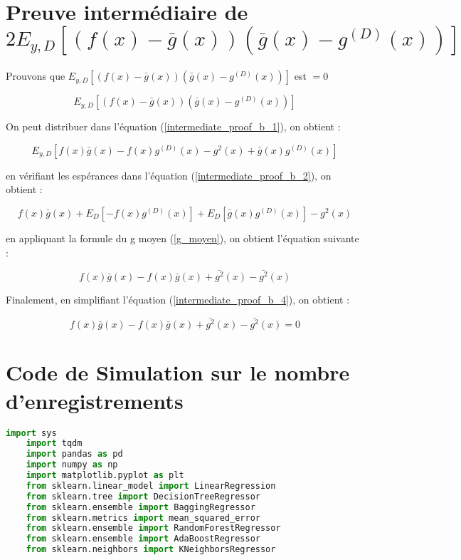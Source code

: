 \documentclass[a4paper]{article}
\begin{document}
\begin{appendices}
	\section{Preuve intermédiaire de $2E_{y,D} [(f(x)-\bar{g}(x)) (\bar{g}(x) - g^{(D)}(x)) ]$}
	\label{intermediate_proof_b_subsection}
	Prouvons que $E_{y,D} [(f(x)-\bar{g}(x)) (\bar{g}(x) - g^{(D)}(x)) ]$ est $= 0$ 
	
	\begin{equation}
		\label{intermediate_proof_b_1}
		E_{y,D} [(f(x)-\bar{g}(x)) (\bar{g}(x) - g^{(D)}(x)) ]
	\end{equation}
	
	On peut distribuer dans l'équation (\ref{intermediate_proof_b_1}), on obtient :
	
	\begin{equation}
		\label{intermediate_proof_b_2}
		E_{y,D} [ f(x)\bar{g}(x) - f(x)g^{(D)}(x) -g^2(x) + \bar{g}(x)g^{(D)}(x)]
	\end{equation}
	
	en vérifiant les espérances dans l'équation (\ref{intermediate_proof_b_2}), on obtient :
	
	\begin{equation}
		\label{intermediate_proof_b_3}
		f(x)\bar{g}(x) + E_{D} [- f(x)g^{(D)}(x)] + E_{D} [ \bar{g}(x)g^{(D)}(x)] -g^2(x)
	\end{equation}
	
	en appliquant la formule du g moyen (\ref{g_moyen}), on obtient l'équation suivante :
	
	\begin{equation}
		\label{intermediate_proof_b_4}
		f(x)\bar{g}(x) - f(x)\bar{g}(x) + \bar{g^2}(x) -\bar{g^2}(x)
	\end{equation}
	
	Finalement, en simplifiant l'équation (\ref{intermediate_proof_b_4}), on obtient :
	
	\begin{equation}
		\label{intermediate_proof_b_5}
		f(x)\bar{g}(x) - f(x)\bar{g}(x) + \bar{g^2}(x) -\bar{g^2}(x) = 0
	\end{equation}

\newpage

\section{Code de Simulation sur le nombre d'enregistrements}

\begin{lstlisting}[language=Python, basicstyle=\small]
	import sys
	import tqdm
	import pandas as pd
	import numpy as np
	import matplotlib.pyplot as plt
	from sklearn.linear_model import LinearRegression
	from sklearn.tree import DecisionTreeRegressor
	from sklearn.ensemble import BaggingRegressor
	from sklearn.metrics import mean_squared_error
	from sklearn.ensemble import RandomForestRegressor
	from sklearn.ensemble import AdaBoostRegressor
	from sklearn.neighbors import KNeighborsRegressor
	

\end{lstlisting}
\end{appendices}
\end{document}
